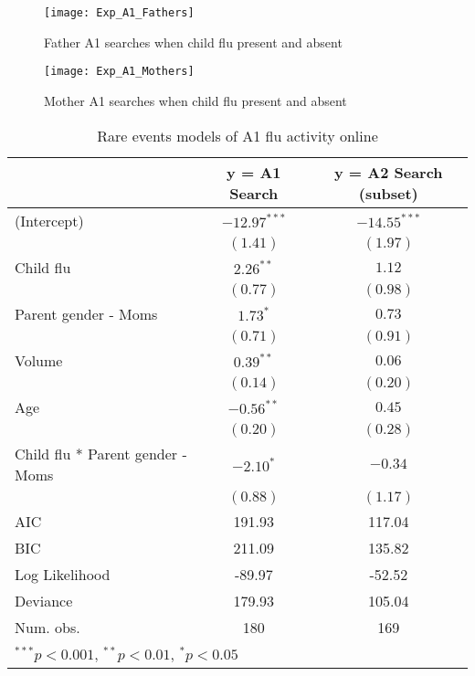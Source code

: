 \documentclass[12pt]{article}
\begin{document}
\begin{figure}[!htbp]
\begin{centering}
   \texttt{[image: Exp\_A1\_Fathers]}
  \caption{Father A1 searches when child flu present and absent}
\label{fathers_a1}
\end{centering}
\end{figure}

\begin{figure}[!htbp]
\begin{centering}
   \texttt{[image: Exp\_A1\_Mothers]}
  \caption{Mother A1 searches when child flu present and absent}
\label{mothers_a1}
\end{centering}
\end{figure}

\begin{table}
\begin{center}
\begin{tabular}{l c c }
\hline
 & y = A1 Search & y = A2 Search (subset) \\
\hline
(Intercept)              & $-12.97^{***}$ & $-14.55^{***}$ \\
                         & $(1.41)$       & $(1.97)$       \\
Child flu                   & $2.26^{**}$    & $1.12$         \\
                         & $(0.77)$       & $(0.98)$       \\
Parent gender - Moms        & $1.73^{*}$     & $0.73$         \\
                         & $(0.71)$       & $(0.91)$       \\
Volume                   & $0.39^{**}$    & $0.06$         \\
                         & $(0.14)$       & $(0.20)$       \\
Age                      & $-0.56^{**}$   & $0.45$         \\
                         & $(0.20)$       & $(0.28)$       \\
Child flu * Parent gender - Moms & $-2.10^{*}$    & $-0.34$        \\
                         & $(0.88)$       & $(1.17)$       \\
\hline
AIC                      & 191.93         & 117.04         \\
BIC                      & 211.09         & 135.82         \\
Log Likelihood           & -89.97         & -52.52         \\
Deviance                 & 179.93         & 105.04         \\
Num. obs.                & 180            & 169            \\
\hline
\multicolumn{3}{l}{\scriptsize{$^{***}p<0.001$, $^{**}p<0.01$, $^*p<0.05$}}
\end{tabular}
\caption{Rare events models of A1 flu activity online}
\label{table:coefficients_parents}
\end{center}
\end{table}
\end{document}
